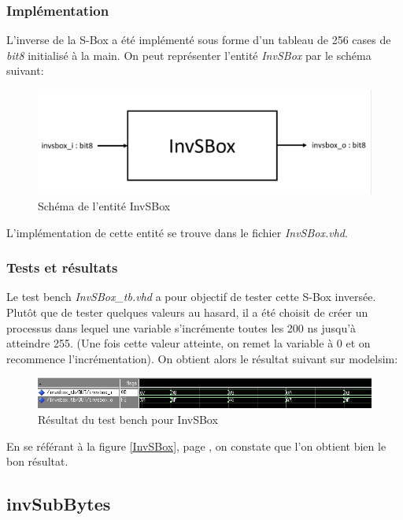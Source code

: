\documentclass[a4paper, 12pt]{article}
\begin{document}
		\subsubsection{Implémentation}
	L'inverse de la S-Box a été implémenté sous forme d'un tableau de 256 cases de \emph{bit8} initialisé à la main. On peut représenter l'entité \emph{InvSBox} par le schéma suivant:
		\begin{figure}[H]
			\begin{center}
			\includegraphics[scale=0.3]{Images/InvSBoxEntity.png}
			\end{center}
			\caption{Schéma de l'entité InvSBox}
			\label{InvSBoxEntity}
		\end{figure}
	L'implémentation de cette entité se trouve dans le fichier \emph{InvSBox.vhd}.
		
		\subsubsection{Tests et résultats}
	Le test bench \emph{InvSBox\_tb.vhd} a pour objectif de tester cette S-Box inversée. Plutôt que de tester quelques valeurs au hasard, il a été choisit de créer un processus dans lequel une variable s'incrémente toutes les 200 ns jusqu'à atteindre 255. (Une fois cette valeur atteinte, on remet la variable à 0 et on recommence l'incrémentation). On obtient alors le résultat suivant sur modelsim:
		\begin{figure}[H]
			\begin{center}
			\includegraphics[scale=0.8]{Images/InvSBoxTb.png}
			\end{center}
			\caption{Résultat du test bench pour InvSBox}
			\label{InvSBoxTb}
		\end{figure}
	En se référant à la figure \ref{InvSBox}, page \pageref{InvSBox}, on constate que l'on obtient bien le bon résultat.
	
	\subsection{invSubBytes}
\end{document}
